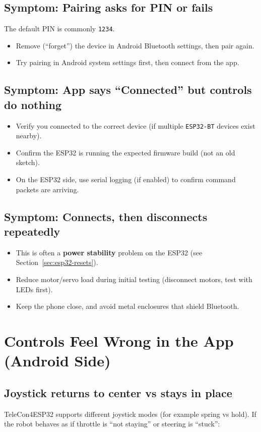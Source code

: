 \subsection*{Symptom: Pairing asks for PIN or fails}
The default PIN is commonly \texttt{1234}.
\begin{itemize}
    \item Remove (``forget'') the device in Android Bluetooth settings, then pair again.
    \item Try pairing in Android system settings first, then connect from the app.
\end{itemize}

\subsection*{Symptom: App says ``Connected'' but controls do nothing}
\begin{itemize}
    \item Verify you connected to the correct device (if multiple \texttt{ESP32-BT} devices exist nearby).
    \item Confirm the ESP32 is running the expected firmware build (not an old sketch).
    \item On the ESP32 side, use serial logging (if enabled) to confirm command packets are arriving.
\end{itemize}

\subsection*{Symptom: Connects, then disconnects repeatedly}
\begin{itemize}
    \item This is often a \textbf{power stability} problem on the ESP32 (see Section~\ref{sec:esp32-resets}).
    \item Reduce motor/servo load during initial testing (disconnect motors, test with LEDs first).
    \item Keep the phone close, and avoid metal enclosures that shield Bluetooth.
\end{itemize}

\section{Controls Feel Wrong in the App (Android Side)}
\label{sec:android-controls}

\subsection*{Joystick returns to center vs stays in place}
TeleCon4ESP32 supports different joystick modes (for example spring vs hold). If the robot behaves
as if throttle is ``not staying'' or steering is ``stuck'':

